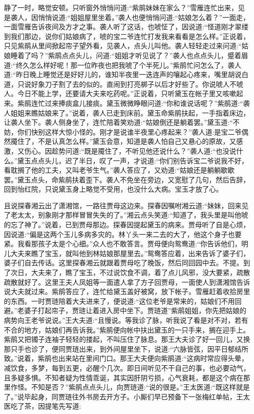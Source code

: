 \begin{parag}
    静了一时，略觉安顿。只听窗外悄悄问道:“紫鹃妹妹在家么？”雪雁连忙出来，见是袭人，因悄悄说道:“姐姐屋里坐着。”袭人也便悄悄问道:“姑娘怎么着？”一面走，一面雪雁告诉夜间及方才之事。袭人听了这话，也唬怔了，因说道:“怪道刚才翠缕到我们那边，说你们姑娘病了，唬的宝二爷连忙打发我来看看是怎么样。”正说着，只见紫鹃从里间掀起帘子望外看，见袭人，点头儿叫他。袭人轻轻走过来问道:“姑娘睡着了吗？”紫鹃点点头儿，问道:“姐姐才听见说了？”袭人也点点头儿，蹙着眉道:“终久怎么样好呢！那一位昨夜也把我唬了个半死儿。”紫鹃忙问怎么了，袭人道:“昨日晚上睡觉还是好好儿的，谁知半夜里一迭连声的嚷起心疼来，嘴里胡说白道，只说好象刀子割了去的似的。直闹到打亮梆子以后才好些了。你说唬人不唬人。今日不能上学，还要请大夫来吃药呢。”正说着，只听黛玉在帐子里又咳嗽起来。紫鹃连忙过来捧痰盒儿接痰。黛玉微微睁眼问道:“你和谁说话呢？”紫鹃道:“袭人姐姐来瞧姑娘来了。”说着，袭人已走到床前。黛玉命紫鹃扶起，一手指着床边，让袭人坐下。袭人侧身坐了，连忙陪着笑劝道:“姑娘倒还是躺着罢。”黛玉道:“不妨，你们快别这样大惊小怪的。刚才是说谁半夜里心疼起来？”袭人道:是宝二爷偶然魇住了，不是认真怎么样。”黛玉会意，知道是袭人怕自己又悬心的原故，又感激，又伤心。因趁势问道:“既是魇住了，不听见他还说什么？”袭人道:“也没说什么。”黛玉点点头儿，迟了半日，叹了一声，才说道:“你们别告诉宝二爷说我不好，看耽搁了他的工夫，又叫老爷生气。”袭人答应了，又劝道:“姑娘还是躺躺歇歇罢。”黛玉点头，命紫鹃扶着歪下。袭人不免坐在旁边，又宽慰了几句，然后告辞，回到怡红院，只说黛玉身上略觉不受用，也没什么大病。宝玉才放了心。
\end{parag}


\begin{parag}
    且说探春湘云出了潇湘馆，一路往贾母这边来。探春因嘱咐湘云道:“妹妹，回来见了老太太，别象刚才那样冒冒失失的了。”湘云点头笑道:“知道了，我头里是叫他唬的忘了神了。”说着，已到贾母那边。探春因提起黛玉的病来。贾母听了自是心烦，因说道:“偏是这两个玉儿多病多灾的。林丫头一来二去的大了，他这个身子也要紧。我看那孩子太是个心细。”众人也不敢答言。贾母便向鸳鸯道:“你告诉他们，明儿大夫来瞧了宝玉，就叫他到林姑娘那屋里去。”鸳鸯答应着，出来告诉了婆子们，婆子们自去传话。这里探春湘云就跟着贾母吃了晚饭，然后同回园中去。不提。到了次日，大夫来了，瞧了宝玉，不过说饮食不调，着了点儿风邪，没大要紧，疏散疏散就好了。这里王夫人凤姐等一面遣人拿了方子回贾母，一面使人到潇湘馆告诉说大夫就过来。紫鹃答应了，连忙给黛玉盖好被窝，放下帐子。雪雁赶着收拾房里的东西。一时贾琏陪着大夫进来了，便说道:“这位老爷是常来的，姑娘们不用回避。”老婆子打起帘子，贾琏让着进入房中坐下。贾琏道”紫鹃姐姐，你先把姑娘的病势向王老爷说说。”王大夫道:“且慢说。等我诊了脉，听我说了看是对不对，若有不合的地方，姑娘们再告诉我。”紫鹃便向帐中扶出黛玉的一只手来，搁在迎手上。紫鹃又把镯子连袖子轻轻的搂起，不叫压住了脉息。那王大夫诊了好一回儿，又换那只手也诊了，便同贾琏出来，到外间屋里坐下，说道:“六脉皆弦，因平日郁结所致。”说着，紫鹃也出来站在里间门口。那王大夫便向紫鹃道:“这病时常应得头晕，减饮食，多梦，每到五更，必醒个几次。即日间听见不干自己的事，也必要动气，且多疑多惧。不知者疑为性情乖诞，其实因肝阴亏损，心气衰耗，都是这个病在那里作怪。不知是否？”紫鹃点点头儿，向贾琏道:“说的很是。”王太医道:“既这样就是了。”说毕起身，同贾琏往外书房去开方子。小厮们早已预备下一张梅红单帖，王太医吃了茶，因提笔先写道:
\end{parag}


